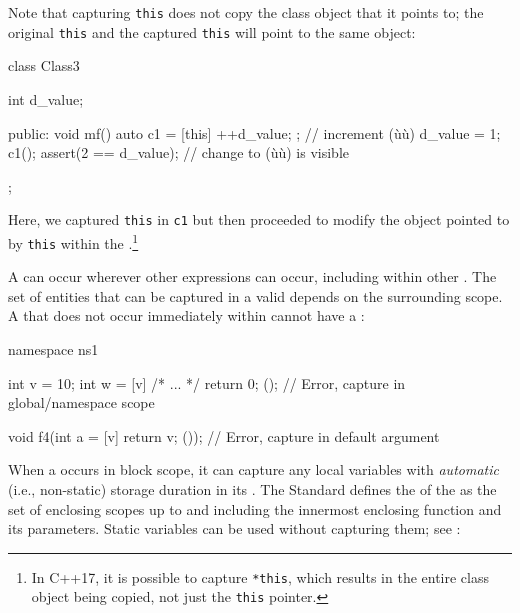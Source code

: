 Note that capturing \lstinline!this! does not copy the class object that it
points to; the original \lstinline!this! and the captured \lstinline!this!
will point to the same object:

\begin{emcppslisting}
class Class3
{
    int d_value;

public:
    void mf()
    {
        auto c1 = [this]{ ++d_value; };  // increment (ù{}ù)
        d_value = 1;
        c1();
        assert(2 == d_value);            // change to (ù{}ù) is visible
    }
};
\end{emcppslisting}
    

Here, we captured \lstinline!this! in \lstinline!c1! but then proceeded to
modify the object pointed to by \lstinline!this! within the .{\cprotect\footnote{In C++17, it is possible to capture
\lstinline!*this!, which results in the entire class object being copied,
  not just the \lstinline!this! pointer.}}

A  can occur wherever other expressions can
occur, including within other . The set of
entities that can be captured in a valid 
depends on the surrounding scope. A  that does
not occur immediately within  cannot have a
:

\begin{emcppslisting}
namespace ns1
{
    int v = 10;
    int w = [v]{ /* ... */ return 0; }();
        // Error, capture in global/namespace scope

    void f4(int a = [v]{ return v; }());  // Error, capture in default argument
}
\end{emcppslisting}
    

When a  occurs in block scope, it can capture
any local variables with \emph{automatic} (i.e., non-static) storage
duration in its . The Standard defines the
 of the  as the set of
enclosing scopes up to and including the innermost enclosing function
and its parameters. Static variables can be used without capturing them;
see :

